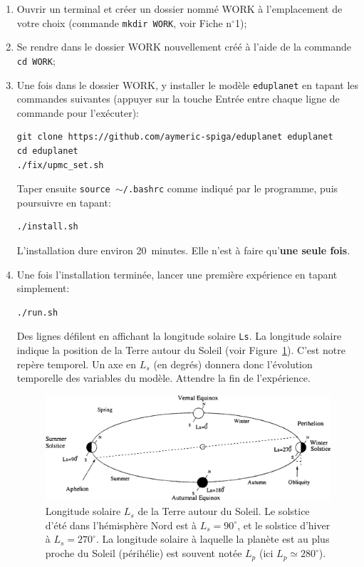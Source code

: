 \documentclass[a4paper,12pt]{article}
\begin{document}
\begin{enumerate}
\item Ouvrir un terminal et créer un dossier nommé WORK à l'emplacement de
votre choix (commande \texttt{mkdir WORK}, voir Fiche n$^\circ$1);
\item Se rendre dans le dossier WORK nouvellement créé à l'aide de la commande
\texttt{cd WORK};
\item Une fois dans le dossier WORK, y installer le modèle \texttt{eduplanet}
en tapant les commandes suivantes (appuyer sur la touche Entrée entre chaque
ligne de commande pour l'exécuter):

\begin{verbatim}
git clone https://github.com/aymeric-spiga/eduplanet eduplanet
cd eduplanet
./fix/upmc_set.sh
\end{verbatim}

Taper ensuite \texttt{source $\sim$/.bashrc} comme indiqué par le programme,
puis poursuivre en tapant:

\begin{verbatim}
./install.sh
\end{verbatim}

L'installation dure environ 20~minutes. Elle n'est à faire qu'\textbf{une seule
fois}.

\item Une fois l'installation terminée, lancer une première expérience en
tapant simplement:

\begin{verbatim}
./run.sh
\end{verbatim}

Des lignes défilent en affichant la longitude solaire \texttt{Ls}. La longitude
solaire indique la position de la Terre autour du Soleil
(voir Figure~\ref{fig-solarlon}). C'est notre repère temporel. Un axe en $L_s$
(en degrés) donnera donc l'évolution temporelle des variables du modèle.
Attendre la fin de l'expérience.

\begin{figure}[htbp]
\centering
\includegraphics[width=14cm]{fig-3T054-Ls.png}
\caption{Longitude solaire $L_s$ de la Terre autour du Soleil. Le solstice
d'été dans l'hémisphère Nord est à $L_s=90^\circ$, et le solstice d'hiver à
$L_s=270^\circ$. La longitude solaire à laquelle la planète est au plus proche
du Soleil (périhélie) est souvent notée $L_p$ (ici $L_p \simeq 280^\circ$).}
\label{fig-solarlon}
\end{figure}


\end{enumerate}
\end{document}
